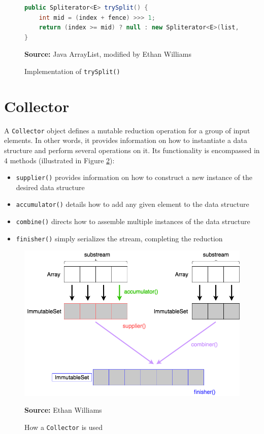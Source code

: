 \documentclass[oneside, 12pt]{article}
\newcommand{\source}[1]{\textbf{Source:} {#1} }
\begin{document}
\begin{figure}[H]
\centering
\begin{lstlisting}[language=Java]
public Spliterator<E> trySplit() {
    int mid = (index + fence) >>> 1;
    return (index >= mid) ? null : new Spliterator<E>(list, index, index = mid);
}
\end{lstlisting}
\caption{Implementation of {\tt trySplit()}}
\source{Java ArrayList, modified by Ethan Williams}
\label{fig:trySplit}
\end{figure}

\section{Collector}
A \verb|Collector| object defines a mutable reduction operation for a group of input elements. In other words, it provides information on how to instantiate a data structure and perform several operations on it. Its functionality is encompassed in 4 methods (illustrated in Figure \ref{fig:collector}):

\begin{itemize}
\item \verb|supplier()| provides information on how to construct a new instance of the desired data structure
\item \verb|accumulator()| details how to add any given element to the data structure
\item \verb|combine()| directs how to assemble multiple instances of the data structure
\item \verb|finisher()|  simply serializes the stream, completing the reduction
\end{itemize}

\begin{figure}[H]
\centering
\includegraphics[width=13cm]{../images/collector.png}
\caption{How a {\tt Collector} is used}
\source{Ethan Williams}
\label{fig:collector}
\end{figure}
\end{document}
